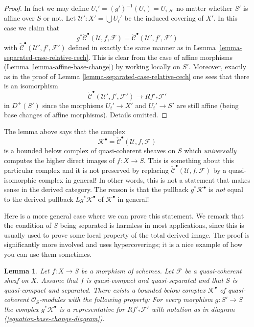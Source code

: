 \documentclass{stacks-project}
\theoremstyle{plain}
\newtheorem{lemma}[subsection]{Lemma}
\theoremstyle{definition}
\theoremstyle{remark}
\numberwithin{equation}{subsection}
\begin{document}
\begin{proof}
In fact we may define $U_i' = (g')^{-1}(U_i) = U_{i, S'}$ no matter
whether $S'$ is affine over $S$ or not.
Let $\mathcal{U}' : X' = \bigcup U_i'$ be the induced covering of $X'$.
In this case we claim that
$$
g^*\check{\mathcal{C}}^\bullet(\mathcal{U}, f, \mathcal{F})
=
\check{\mathcal{C}}^\bullet(\mathcal{U}', f', \mathcal{F}')
$$
with $\check{\mathcal{C}}^\bullet(\mathcal{U}', f', \mathcal{F}')$
defined in exactly the same manner as in
Lemma \ref{lemma-separated-case-relative-cech}.
This is clear from the case of affine morphisms
(Lemma \ref{lemma-affine-base-change}) by working locally on $S'$.
Moreover, exactly as in the proof of
Lemma \ref{lemma-separated-case-relative-cech}
one sees that there is an isomorphism
$$
\check{\mathcal{C}}^\bullet(\mathcal{U}', f', \mathcal{F}')
\longrightarrow
Rf'_*\mathcal{F}'
$$
in $D^{+}(S')$ since the morphisms $U_i' \to X'$ and $U_i' \to S'$
are still affine (being base changes of affine morphisms).
Details omitted.
\end{proof}

\noindent
The lemma above says that the complex
$$
\mathcal{K}^\bullet = \check{\mathcal{C}}^\bullet(\mathcal{U}, f, \mathcal{F})
$$
is a bounded below complex of quasi-coherent sheaves on $S$ which
{\it universally} computes the higher direct images of $f : X \to S$.
This is something about this particular complex and
it is not preserved by replacing
$\check{\mathcal{C}}^\bullet(\mathcal{U}, f, \mathcal{F})$ by
a quasi-isomorphic complex in general! In other words, this is
not a statement that makes sense in the derived category.
The reason is that the pullback $g^*\mathcal{K}^\bullet$ is
{\it not} equal to the derived pullback $Lg^*\mathcal{K}^\bullet$
of $\mathcal{K}^\bullet$ in general!

\medskip\noindent
Here is a more general case where we can prove this statement.
We remark that the condition of $S$ being separated is harmless
in most applications, since this is usually used to prove some
local property of the total derived image.
The proof is significantly more involved and uses hypercoverings;
it is a nice example of how you can use them sometimes.

\begin{lemma}
\label{lemma-hypercoverings}
Let $f : X \to S$ be a morphism of schemes.
Let $\mathcal{F}$ be a quasi-coherent sheaf on $X$.
Assume that $f$ is quasi-compact and quasi-separated and
that $S$ is quasi-compact and separated.
There exists a bounded below complex $\mathcal{K}^\bullet$
of quasi-coherent $\mathcal{O}_S$-modules with the
following property: For every morphism
$g : S' \to S$ the complex $g^*\mathcal{K}^\bullet$ is
a representative for $Rf'_*\mathcal{F}'$ with notation as in
diagram (\ref{equation-base-change-diagram}).
\end{lemma}
\end{document}
